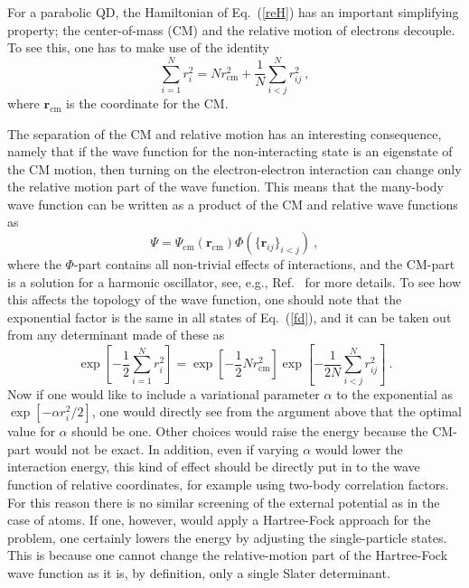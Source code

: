 \documentclass{article}
\begin{document}
For a parabolic QD, the Hamiltonian of Eq.~(\ref{reH}) has an
important simplifying property; the center-of-mass (CM) and the
relative motion of electrons decouple. To see this, one has to make
use of the identity
\begin{equation}
\sum_{i=1}^N r_i^2 = N r_{\mathrm{cm}}^2+\frac{1}{N} \sum_{i<j}^N r_{ij}^2 \ ,
\end{equation}
where $\mathbf{r}_{\mathrm{cm}}$ is the coordinate for the CM.

The separation of the CM and relative motion has an interesting
consequence, namely that if the wave function for the non-interacting
state is an eigenstate of the CM motion, then turning on the
electron-electron interaction can change only the relative motion part
of the wave function. This means that the many-body wave function can
be written as a product of the CM and relative wave functions as
\begin{equation}
\Psi = \Psi_{\mathrm{cm}}(\mathbf{r}_{\mathrm{cm}}) 
\Phi(\{\mathbf{r}_{ij}\}_{i<j}) \ ,
\end{equation}
where the $\Phi$-part contains all non-trivial effects of
interactions, and the CM-part is a solution for a harmonic oscillator,
see, e.g., Ref.~ for more details. To see how this
affects the topology of the wave function, one should note that the
exponential factor is the same in all states of Eq.~(\ref{fd}), and it
can be taken out from any determinant made of these as
\begin{equation}
\exp\left[-\frac12 \sum_{i=1}^N r_i^2\right] = \exp\left[-\frac12 N
r_{\mathrm{cm}}^2 \right]\exp\left[-\frac{1}{2N} \sum_{i<j}^N
r_{ij}^2\right] \ .
\end{equation}
Now if one would like to include a variational parameter $\alpha$ to
the exponential as $\exp[- \alpha r_i^2/2]$, one would directly see from
the argument above that the optimal value for $\alpha$ should be
one. Other choices would raise the energy because the CM-part would
not be exact.  In addition, even if varying $\alpha$ would lower the
interaction energy, this kind of effect should be directly put in to
the wave function of relative coordinates, for example using two-body
correlation factors.  For this reason there is no similar screening of
the external potential as in the case of atoms. If one, however, would
apply a Hartree-Fock approach for the problem, one certainly lowers
the energy by adjusting the single-particle states. This is because
one cannot change the relative-motion part of the Hartree-Fock wave
function as it is, by definition, only a single Slater determinant.
\end{document}
